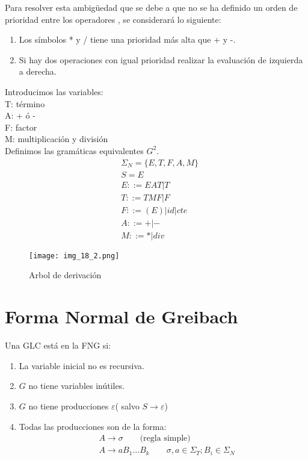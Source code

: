 Para resolver esta ambigüedad que se debe a que no se ha definido un orden de prioridad entre los operadores , se considerará lo siguiente:
\begin{enumerate}
\item Los símbolos * y / tiene una prioridad más alta que + y -.
\item Si hay dos operaciones con igual prioridad realizar la evaluación de izquierda a derecha.
\end{enumerate}
Introducimos las variables:\\
T: término	\\
A: + ó -	\\
F: factor	\\
M: multiplicación y división	\\
Definimos las gramáticas equivalentes $G^2$.
\begin{align*}
&\Sigma_N=\{E,T,F,A,M\}\\
&S=E	\\
&E::=EAT|T	\\
&T::=TMF|F	\\
&F::=(E)|id|cte	\\
&A::=+|-	\\
&M::=*|div
\end{align*}
\begin{figure}[h!]
\centering
\texttt{[image: img\_18\_2.png]}
\caption{Arbol de derivación}\label{img_18_2}
\end{figure}

\section{Forma Normal de Greibach}
Una GLC está en la FNG si:
\begin{enumerate}
\item La variable inicial no es recursiva.
\item $G$ no tiene variables inútiles.
\item $G$ no tiene producciones $\varepsilon$( salvo $S\rightarrow\varepsilon$)
\item Todas las producciones son de la forma:
\begin{align*}
&A\rightarrow \sigma\qquad\mbox{(regla simple)}	\\
&A\rightarrow aB_1...B_k	\qquad\sigma,a\in\Sigma_T; B_i\in\Sigma_N	\\
\end{align*}
\end{enumerate}

